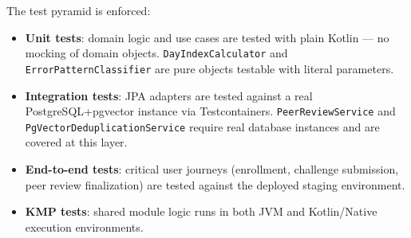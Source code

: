 The test pyramid is enforced:
\begin{itemize}
    \item \textbf{Unit tests}: domain logic and use cases are tested with plain Kotlin — no mocking of domain objects. \texttt{DayIndexCalculator} and \texttt{ErrorPatternClassifier} are pure objects testable with literal parameters.
    \item \textbf{Integration tests}: JPA adapters are tested against a real PostgreSQL+pgvector instance via Testcontainers. \texttt{PeerReviewService} and \texttt{PgVectorDeduplicationService} require real database instances and are covered at this layer.
    \item \textbf{End-to-end tests}: critical user journeys (enrollment, challenge submission, peer review finalization) are tested against the deployed staging environment.
    \item \textbf{KMP tests}: shared module logic runs in both JVM and Kotlin/Native execution environments.
\end{itemize}
